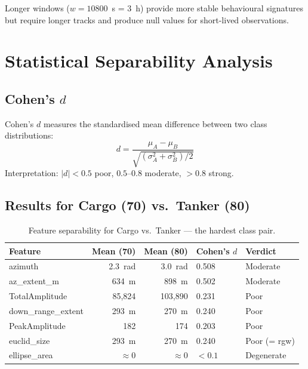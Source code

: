 \documentclass[journal]{IEEEtran}
\begin{document}
Longer windows ($w=10800$~s = 3~h) provide more stable behavioural signatures
but require longer tracks and produce null values for short-lived observations.

\section{Statistical Separability Analysis}
\label{sec:separability}

\subsection{Cohen's $d$}

Cohen's $d$ measures the standardised mean difference between two class
distributions:
\begin{equation}
  d = \frac{\mu_A - \mu_B}{\sqrt{(\sigma_A^2 + \sigma_B^2)/2}}
\end{equation}
Interpretation: $|d| < 0.5$ poor, $0.5$--$0.8$ moderate, $>0.8$ strong.

\subsection{Results for Cargo (70) vs.\ Tanker (80)}

\begin{table}[H]
\centering
\caption{Feature separability for Cargo vs.\ Tanker — the hardest class pair.}
\begin{tabular}{lrrll}
\toprule
\textbf{Feature} & \textbf{Mean (70)} & \textbf{Mean (80)} & \textbf{Cohen's $d$} & \textbf{Verdict} \\
\midrule
azimuth              & 2.3~rad & 3.0~rad & 0.508 & Moderate \\
az\_extent\_m        & 634~m   & 898~m   & 0.502 & Moderate \\
TotalAmplitude       & 85,824  & 103,890 & 0.231 & Poor \\
down\_range\_extent  & 293~m   & 270~m   & 0.240 & Poor \\
PeakAmplitude        & 182     & 174     & 0.203 & Poor \\
euclid\_size         & 293~m   & 270~m   & 0.240 & Poor (= rgw) \\
ellipse\_area        & $\approx0$ & $\approx0$ & $<0.1$ & Degenerate \\
\bottomrule
\end{tabular}
\end{table}
\end{document}
